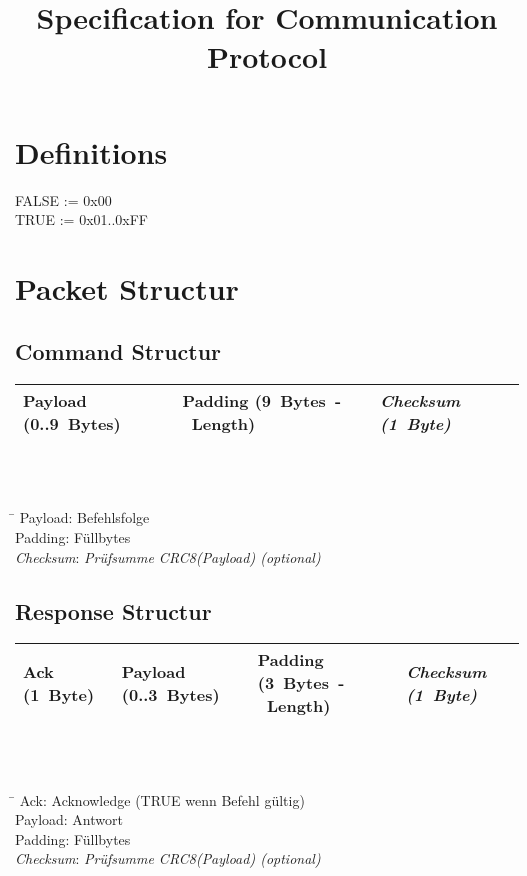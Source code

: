 \documentclass[10pt,a4paper]{article}
\title{Specification for Communication Protocol}
\author{}
\date{}
\newcommand{\BL}{9 }
\begin{document}
\maketitle
\tableofcontents
\section*{Definitions}
FALSE := 0x00\\
TRUE := 0x01..0xFF\\

\section{Packet Structur}
\subsection{Command Structur}
\begin{tabular}{|p{2.2cm}|p{3.2cm}|p{2cm}|}
	\hline 
	Payload \mbox{(0..\BL Bytes)} & 
	Padding \mbox{(\BL Bytes - Length)} & 
	\textit{Checksum \mbox{(1 Byte)}} \\
	\hline 
\end{tabular}  
\\\\
\begin{tabbing}
	\hspace*{2cm} \= \kill
	Payload: \>Befehlsfolge\\
	Padding: \>Füllbytes\\
	\textit{Checksum}: \>\textit{Prüfsumme CRC8(Payload) (optional)}\\
\end{tabbing}

\subsection{Response Structur} 
\begin{tabular}{|p{1.5cm}|p{2.2cm}|p{3.2cm}|p{2cm}|}
	\hline 
	Ack \mbox{(1 Byte)} &
	Payload \mbox{(0..3 Bytes)} & 
	Padding \mbox{(3 Bytes - Length)} & 
	\textit{Checksum \mbox{(1 Byte)}} \\
	\hline 
\end{tabular}  
\\\\
\begin{tabbing}
	\hspace*{2cm} \= \kill
	Ack:	 \>Acknowledge (TRUE wenn Befehl gültig)\\
	Payload: \>Antwort\\
	Padding: \>Füllbytes\\
	\textit{Checksum}: \>\textit{Prüfsumme CRC8(Payload) (optional)}\\
\end{tabbing}
\end{document}
